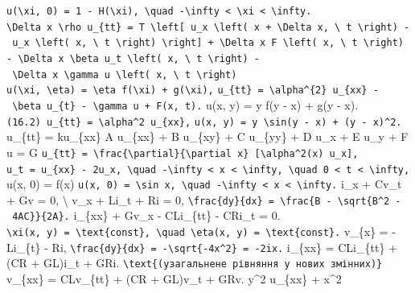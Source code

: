 \documentclass[
  ukrainian,
]{article}
\begin{document}
\texttt{u(\textbackslash{}xi,\ 0)\ =\ 1\ -\ H(\textbackslash{}xi),\ \textbackslash{}quad\ -\textbackslash{}infty\ \textless{}\ \textbackslash{}xi\ \textless{}\ \textbackslash{}infty.}
\texttt{\textbackslash{}Delta\ x\ \textbackslash{}rho\ u\_\{tt\}\ =\ T\ \textbackslash{}left{[}\ u\_x\ \textbackslash{}left(\ x\ +\ \textbackslash{}Delta\ x,\ \textbackslash{}\ t\ \textbackslash{}right)\ -\ u\_x\ \textbackslash{}left(\ x,\ \textbackslash{}\ t\ \textbackslash{}right)\ \textbackslash{}right{]}\ +\ \textbackslash{}Delta\ x\ F\ \textbackslash{}left(\ x,\ \textbackslash{}\ t\ \textbackslash{}right)\ -\ \textbackslash{}Delta\ x\ \textbackslash{}beta\ u\_t\ \textbackslash{}left(\ x,\ \textbackslash{}\ t\ \textbackslash{}right)\ -\ \textbackslash{}Delta\ x\ \textbackslash{}gamma\ u\ \textbackslash{}left(\ x,\ \textbackslash{}\ t\ \textbackslash{}right)}
\texttt{u(\textbackslash{}xi,\ \textbackslash{}eta)\ =\ \textbackslash{}eta\ f(\textbackslash{}xi)\ +\ g(\textbackslash{}xi),}
\texttt{u\_\{tt\}\ =\ \textbackslash{}alpha\^{}\{2\}\ u\_\{xx\}\ -\ \textbackslash{}beta\ u\_\{t\}\ -\ \textbackslash{}gamma\ u\ +\ F(x,\ t).}
u(x, y) = y f(y - x) + g(y - x).
\texttt{(16.2)\ u\_\{tt\}\ =\ \textbackslash{}alpha\^{}2\ u\_\{xx\},}
\texttt{u(x,\ y)\ =\ y\ \textbackslash{}sin(y\ -\ x)\ +\ (y\ -\ x)\^{}2.}
u\_\{tt\} = ku\_\{xx\} A u\_\{xx\} + B u\_\{xy\} + C u\_\{yy\} + D u\_x
+ E u\_y + F u = G
\texttt{u\_\{tt\}\ =\ \textbackslash{}frac\{\textbackslash{}partial\}\{\textbackslash{}partial\ x\}\ {[}\textbackslash{}alpha\^{}2(x)\ u\_x{]},}
\texttt{u\_t\ =\ u\_\{xx\}\ -\ 2u\_x,\ \textbackslash{}quad\ -\textbackslash{}infty\ \textless{}\ x\ \textless{}\ \textbackslash{}infty,\ \textbackslash{}quad\ 0\ \textless{}\ t\ \textless{}\ \textbackslash{}infty,}
u(x, 0) = f(x)
\texttt{u(x,\ 0)\ =\ \textbackslash{}sin\ x,\ \textbackslash{}quad\ -\textbackslash{}infty\ \textless{}\ x\ \textless{}\ \textbackslash{}infty.}
i\_x + Cv\_t + Gv = 0, \textbackslash{} v\_x + Li\_t + Ri = 0,
\texttt{\textbackslash{}frac\{dy\}\{dx\}\ =\ \textbackslash{}frac\{B\ -\ \textbackslash{}sqrt\{B\^{}2\ -\ 4AC\}\}\{2A\}.}
i\_\{xx\} + Gv\_x - CLi\_\{tt\} - CRi\_t = 0.
\texttt{\textbackslash{}xi(x,\ y)\ =\ \textbackslash{}text\{const\},\ \textbackslash{}quad\ \textbackslash{}eta(x,\ y)\ =\ \textbackslash{}text\{const\}.}
v\_\{x\} = -Li\_\{t\} - Ri,
\texttt{\textbackslash{}frac\{dy\}\{dx\}\ =\ -\textbackslash{}sqrt\{-4x\^{}2\}\ =\ -2ix.}
i\_\{xx\} = CLi\_\{tt\} + (CR + GL)i\_t + GRi.
\texttt{\textbackslash{}text\{(узагальнене\ рівняння\ у\ нових\ змінних)\}}
v\_\{xx\} = CLv\_\{tt\} + (CR + GL)v\_t + GRv. y\^{}2 u\_\{xx\} + x\^{}2
\end{document}
